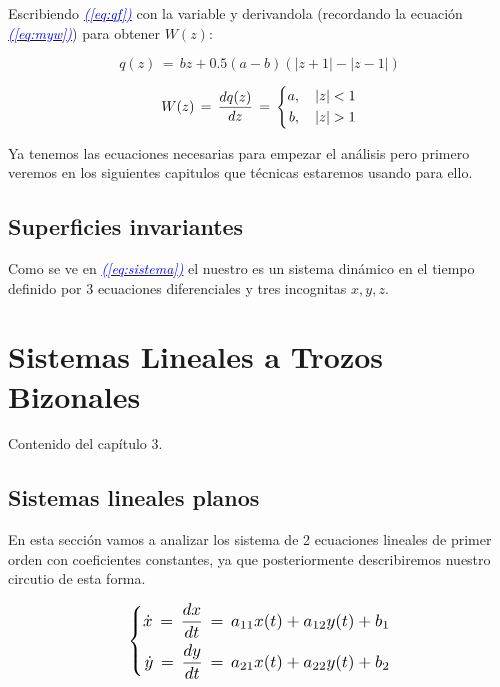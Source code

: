 \documentclass[12pt,a4paper]{report} %
\newcommand{\eref}[1]{\hyperref[#1]{\textcolor{blue}{\textit{(\ref*{#1})}}}}
\begin{document}
    Escribiendo \eref{eq:qf} con la variable  y derivandola (recordando la ecuación \eref{eq:myw}) para obtener $W(z)$:
    
    \begin{equation}
    	q(z)\,=\,bz+0.5(a-b)(|z+1|-|z-1|)
    	\label{eq:qfz}
    \end{equation}
    
    \begin{equation}
    	W(z)\,=\,\frac{dq(z)}{dz}\,=\,
    		\label{eq:wz}
    		\scalebox{1}{$\displaystyle
    			\left\{
    			\begin{aligned}
    				a, \quad   |z| < 1\\
    				b, \quad   |z| > 1
    			\end{aligned}
    			\right.
    			$}
    \end{equation}
    
	Ya tenemos las ecuaciones necesarias para empezar el análisis pero primero veremos en los siguientes capitulos que técnicas estaremos usando para ello.
	\newpage
	\section{Superficies invariantes}
	Como se ve en \eref{eq:sistema} el nuestro es un sistema dinámico en el tiempo definido por 3 ecuaciones diferenciales y tres incognitas $x, y, z$.
	
	
	
	\chapter{Sistemas Lineales a Trozos Bizonales}
	Contenido del capítulo 3.
	\newpage
	\section{Sistemas lineales planos}
	En esta sección vamos a analizar los sistema de 2 ecuaciones lineales de primer orden con coeficientes constantes, ya que posteriormente describiremos nuestro circutio de esta forma.
	
	\begin{equation}
		\label{eq:edo2}
		\scalebox{1.2}{$\displaystyle
			\left\{
			\begin{aligned}
				\dot{x}\,=\,\frac{dx}{dt}\,=\,a_{11}x(t)+a_{12}y(t)+b_1 \\
				\dot{y}\,=\,\frac{dy}{dt}\,=\,a_{21}x(t)+a_{22}y(t)+b_2
			\end{aligned}
			\right.
			$}
	\end{equation}\smallskip
	
\end{document}
